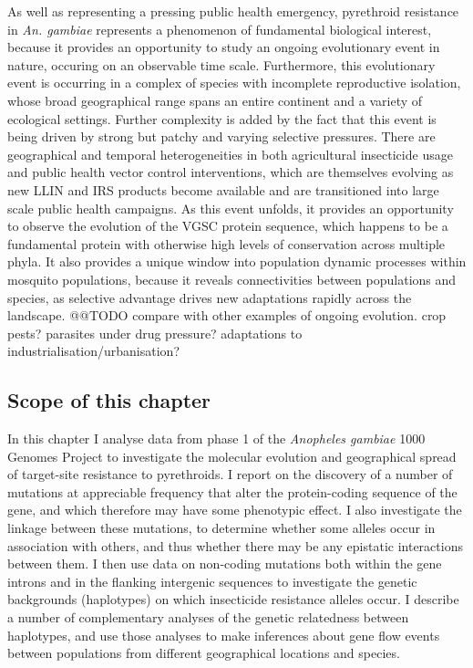 \documentclass[a4paper,11pt,abstracton,hidelinks]{scrartcl}
\newcommand{\agam}{\textit{An. gambiae}\xspace}
\begin{document}
%
As well as representing a pressing public health emergency, pyrethroid resistance in \agam represents a phenomenon of fundamental biological interest, because it provides an opportunity to study an ongoing evolutionary event in nature, occuring on an observable time scale.
%
Furthermore, this evolutionary event is occurring in a complex of species with incomplete reproductive isolation, whose broad geographical range spans an entire continent and a variety of ecological settings.
%
Further complexity is added by the fact that this event is being driven by strong but patchy and varying selective pressures.
%
There are geographical and temporal heterogeneities in both agricultural insecticide usage and public health vector control interventions, which are themselves evolving as new LLIN and IRS products become available and are transitioned into large scale public health campaigns.
%
As this event unfolds, it provides an opportunity to observe the evolution of the VGSC protein sequence, which happens to be a fundamental protein with otherwise high levels of conservation across multiple phyla.
%
It also provides a unique window into population dynamic processes within mosquito populations, because it reveals connectivities between populations and species, as selective advantage drives new adaptations rapidly across the landscape.
%
@@TODO compare with other examples of ongoing evolution. crop pests? parasites under drug pressure? adaptations to industrialisation/urbanisation?


\subsection*{Scope of this chapter}


%
In this chapter I analyse data from phase 1 of the \textit{Anopheles gambiae} 1000 Genomes Project to investigate the molecular evolution and geographical spread of target-site resistance to pyrethroids.
%
I report on the discovery of a number of mutations at appreciable frequency that alter the protein-coding sequence of the gene, and which therefore may have some phenotypic effect.
%
I also investigate the linkage between these mutations, to determine whether some alleles occur in association with others, and thus whether there may be any epistatic interactions between them.
%
I then use data on non-coding mutations both within the gene introns and in the flanking intergenic sequences to investigate the genetic backgrounds (haplotypes) on which insecticide resistance alleles occur.
%
I describe a number of complementary analyses of the genetic relatedness between haplotypes, and use those analyses to make inferences about gene flow events between populations from different geographical locations and species.
\end{document}
